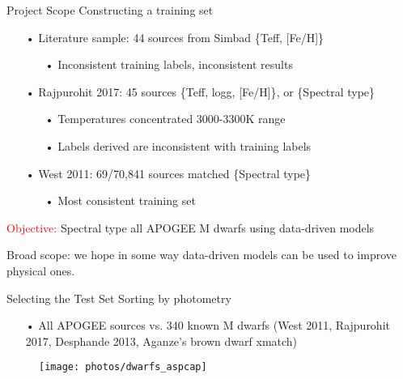 \documentclass[compress]{beamer}
\begin{document}
\begin{frame}{Project Scope}
\large Constructing a training set
\begin{enumerate} \large
	\item[•] Literature sample: 44 sources from Simbad \textcolor{sthlmDarkGreen}{\{Teff, [Fe/H]\}}
	\begin{enumerate}
		\item[•] Inconsistent training labels, inconsistent results
	\end{enumerate}

	\pause
	\item[•] Rajpurohit 2017: 45 sources \textcolor{sthlmDarkGreen}{\{Teff, logg, [Fe/H]\}}, or \textcolor{sthlmDarkGreen}{\{Spectral type\}}
	\begin{enumerate}
		\item[•] Temperatures concentrated 3000-3300K range
		\item[•] Labels derived are inconsistent with training labels
	\end{enumerate}

	\pause
	\item[•] West 2011: 69/70,841 sources matched \textcolor{sthlmDarkGreen}{\{Spectral type\}}
	\begin{enumerate}
		\item[•] Most consistent training set
	\end{enumerate}

\end{enumerate}

\pause 
\textcolor{red}{Objective:} Spectral type all APOGEE M dwarfs using data-driven models  

\pause
\textcolor{sthlmDarkGreen}{Broad scope:} we hope in some way data-driven models can be used to improve physical ones.
\end{frame}


\begin{frame}{Selecting the Test Set}
Sorting by photometry
\begin{enumerate} \small
	\item[•] All APOGEE sources vs. 340 known M dwarfs (West 2011, Rajpurohit 2017, Desphande 2013, Aganze's brown dwarf xmatch)
\end{enumerate}
\begin{figure}
	\texttt{[image: photos/dwarfs\_aspcap]} 
\end{figure}
\end{frame}
\end{document}
